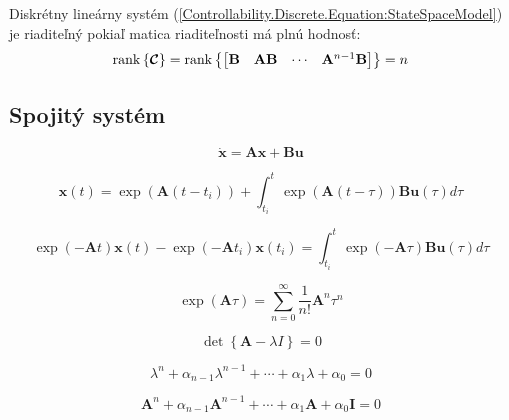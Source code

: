\documentclass[a4paper, 10pt, ]{article}
\begin{document}
\begin{theorem}
    Diskrétny lineárny systém (\ref{Controllability.Discrete.Equation:StateSpaceModel}) je riaditeľný pokiaľ matica riaditeľnosti má plnú hodnosť:
    \begin{equation}
        \label{Controllability.Discrete.Equation:ControllabilityTheorem}
        \mathrm{rank} \left\{ \boldsymbol{\mathcal{C}} \right\} = 
        \mathrm{rank} \left\{
            \begin{bmatrix}
                \mathbf{B} & \mathbf{A} \mathbf{B} & \cdots & \mathbf{A}^{n - 1} \mathbf{B}
            \end{bmatrix}
        \right\} = 
        n
    \end{equation}
\end{theorem}



\subsection{Spojitý systém}

\begin{equation}
    \label{Controllability.Continuous.Equation:StateSpaceModel}
    \dot{\bm{x}} = \bm{A} \bm{x} + \bm{B} \bm{u}
\end{equation}

\begin{equation}
    \bm{x}(t) = \exp \left( \bm{A} (t - t_i) \right) + \int_{t_i}^{t} \exp(\bm{A} (t - \tau)) \bm{B} \bm{u}(\tau) d\tau
\end{equation}

\begin{equation}
    \exp(-\bm{A}t) \bm{x}(t) - \exp(-\bm{A} t_i) \bm{x}(t_i) = \int_{t_i}^{t} \exp(-\bm{A} \tau) \bm{B} \bm{u}(\tau) d\tau
\end{equation}

\begin{equation}
    \exp(\bm{A}\tau) = \sum_{n = 0}^{\infty} \frac{1}{n!} \bm{A}^{n} \tau^{n}
\end{equation}

\begin{equation}
    \det \left\{ \bm{A} - \lambda {I} \right\} = 0
\end{equation}

\begin{equation}
    \lambda^n + \alpha_{n - 1} \lambda^{n - 1} + \cdots + \alpha_{1} \lambda + \alpha_{0} = 0
\end{equation}

\begin{equation}
    \bm{A}^n + \alpha_{n - 1} \bm{A}^{n - 1} + \cdots + \alpha_{1} \bm{A} + \alpha_{0} \bm{I} = 0
\end{equation}
\end{document}
